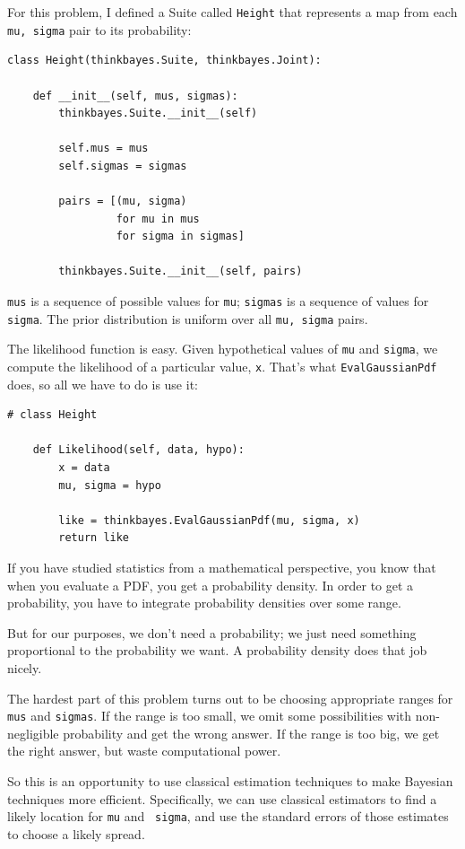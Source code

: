 \documentclass[12pt]{book}
\begin{document}
For this problem, I defined a Suite called {\tt Height} that
represents a map from each {\tt mu, sigma} pair to its probability:

\begin{verbatim}
class Height(thinkbayes.Suite, thinkbayes.Joint):

    def __init__(self, mus, sigmas):
        thinkbayes.Suite.__init__(self)

        self.mus = mus
        self.sigmas = sigmas

        pairs = [(mu, sigma) 
                 for mu in mus
                 for sigma in sigmas]

        thinkbayes.Suite.__init__(self, pairs)
\end{verbatim}

{\tt mus} is a sequence of possible values for {\tt mu}; {\tt sigmas}
is a sequence of values for {\tt sigma}.  The prior distribution
is uniform over all {\tt mu, sigma} pairs.

The likelihood function is easy.  Given hypothetical values
of {\tt mu} and {\tt sigma}, we compute the likelihood
of a particular value, {\tt x}.  That's what {\tt EvalGaussianPdf}
does, so all we have to do is use it:

\begin{verbatim}
# class Height

    def Likelihood(self, data, hypo):
        x = data
        mu, sigma = hypo

        like = thinkbayes.EvalGaussianPdf(mu, sigma, x)
        return like
\end{verbatim}

If you have studied statistics from a mathematical perspective,
you know that when you evaluate a PDF, you get a probability
density.  In order to get a probability, you have to integrate
probability densities over some range.

But for our purposes, we don't need a probability; we just
need something proportional to the probability we want.
A probability density does that job nicely.

The hardest part of this problem turns
out to be choosing appropriate ranges for {\tt mus} and
{\tt sigmas}.  If the range is too small, we omit some
possibilities with non-negligible probability and get the
wrong answer.  If the range is too big, we get the right answer,
but waste computational power.

So this is an opportunity to use classical estimation techniques to
make Bayesian techniques more efficient.  Specifically, we can use
classical estimators to find a likely location for {\tt mu} and {\tt
  sigma}, and use the standard errors of those estimates to choose a
likely spread.
\end{document}
